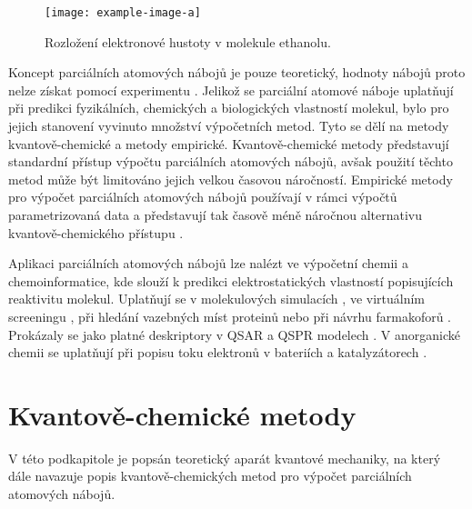 \bigskip
\begin{figure}[h]
\begin{center}
\texttt{[image: example-image-a]}
\caption{Rozložení elektronové hustoty v molekule ethanolu.}
\end{center}
\end{figure}
Koncept parciálních atomových nábojů je pouze teoretický, hodnoty nábojů proto nelze získat pomocí experimentu \cite{Leach}. Jelikož se parciální atomové náboje uplatňují při predikci fyzikálních, chemických a biologických vlastností molekul, bylo pro jejich stanovení vyvinuto množství výpočetních metod. Tyto se dělí na metody kvantově-chemi\-cké a metody empirické. Kvantově-chemické metody představují standardní přístup výpočtu parciálních atomových nábojů,  avšak použití těchto metod může být limitováno jejich velkou časovou náročností. Empirické metody pro výpočet parciálních atomových nábojů používají v rámci výpočtů parametrizovaná data a představují tak časově méně náročnou alternativu kvantově-chemického přístupu \cite{Gasteiger:Textbook}. 

Aplikaci parciálních atomových nábojů lze nalézt ve výpočetní chemii a chemoinformatice, kde slouží k predikci elektrostatických vlastností popisujících reaktivitu molekul. Uplatňují se v molekulových simulacích \cite{molsimul}, ve virtuálním screeningu \cite{virtscreen}, při hledání vazebných míst proteinů nebo při návrhu farmakoforů \cite{farmak}. Prokázaly se jako platné deskriptory v QSAR a QSPR modelech \cite{Ghaf:QSAR, QSPR2}. V anorganické chemii se uplatňují při popisu toku elektronů v bateriích a katalyzátorech \cite{innorg}. 

\section{Kvantově-chemické metody}
V této podkapitole je popsán teoretický aparát kvantové mechaniky, na který dále navazuje popis kvantově-chemických metod pro výpočet parciálních atomových nábojů. 

